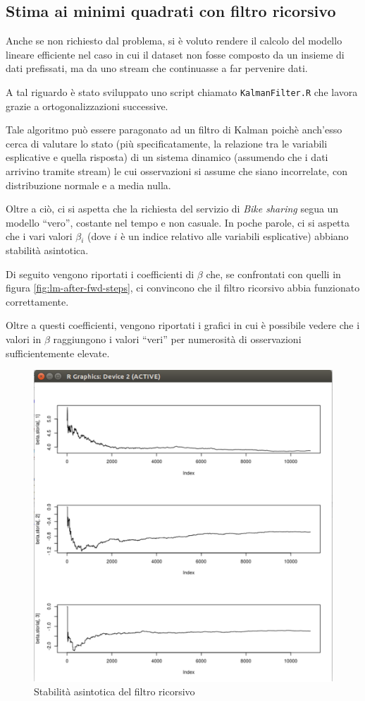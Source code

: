 
\subsection{Stima ai minimi quadrati con filtro ricorsivo}
Anche se non richiesto dal problema, si è voluto rendere il calcolo del
modello lineare efficiente nel caso in cui il dataset non fosse composto da un
insieme di dati prefissati, ma da uno stream che continuasse a far pervenire
dati.

A tal riguardo è stato sviluppato uno script chiamato \texttt{KalmanFilter.R}
che lavora grazie a ortogonalizzazioni successive.

Tale algoritmo può essere paragonato ad un filtro di Kalman poichè anch'esso
cerca di valutare lo stato (più specificatamente, la relazione tra le
variabili esplicative e quella risposta) di un sistema dinamico (assumendo che
i dati arrivino tramite stream) le cui osservazioni si assume che siano
incorrelate, con distribuzione normale e a media nulla.

Oltre a ciò, ci si aspetta che la richiesta del servizio di \emph{Bike sharing}
segua un modello ``vero'', costante nel tempo e non casuale. In poche parole,
ci si aspetta che i vari valori $ \beta{}_i $ (dove $i$ è un indice relativo
alle variabili esplicative) abbiano stabilità asintotica.

Di seguito vengono riportati i coefficienti di $ \beta{} $ che, se confrontati
con quelli in figura \ref{fig:lm-after-fwd-steps}, ci convincono che il filtro
ricorsivo abbia funzionato correttamente.

Oltre a questi coefficienti, vengono riportati i grafici in cui è possibile
vedere che i valori in $ \beta{} $ raggiungono i valori ``veri'' per numerosità
di osservazioni sufficientemente elevate.

\begin{figure}[H]
  \centering
  \includegraphics[width=.55\columnwidth]{images/lm/kalman-asymptotic.eps}
  \caption{Stabilità asintotica del filtro ricorsivo}
    \label{fig:kalman-asymptotic}
\end{figure}

